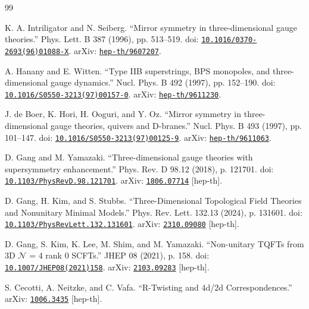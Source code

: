 \documentclass[11pt,a4paper]{article}
\numberwithin{equation}{section}
\begin{document}
\begin{thebibliography}{99}
\small

K. A. Intriligator and N. Seiberg. ``Mirror symmetry in three-dimensional gauge theories.'' Phys. Lett. B 387 (1996), pp. 513--519. doi: \href{https://doi.org/10.1016/0370-2693(96)01088-X}{\nolinkurl{10.1016/0370-2693(96)01088-X}}. arXiv: \href{https://arxiv.org/abs/hep-th/9607207}{\nolinkurl{hep-th/9607207}}.

A. Hanany and E. Witten. ``Type IIB superstrings, BPS monopoles, and three-dimensional gauge dynamics.'' Nucl. Phys. B 492 (1997), pp. 152--190. doi: \href{https://doi.org/10.1016/S0550-3213(97)00157-0}{\nolinkurl{10.1016/S0550-3213(97)00157-0}}. arXiv: \href{https://arxiv.org/abs/hep-th/9611230}{\nolinkurl{hep-th/9611230}}.

J. de Boer, K. Hori, H. Ooguri, and Y. Oz. ``Mirror symmetry in three-dimensional gauge theories, quivers and D-branes.'' Nucl. Phys. B 493 (1997), pp. 101--147. doi: \href{https://doi.org/10.1016/S0550-3213(97)00125-9}{\nolinkurl{10.1016/S0550-3213(97)00125-9}}. arXiv: \href{https://arxiv.org/abs/hep-th/9611063}{\nolinkurl{hep-th/9611063}}.

D. Gang and M. Yamazaki. ``Three-dimensional gauge theories with supersymmetry enhancement.'' Phys. Rev. D 98.12 (2018), p. 121701. doi: \href{https://doi.org/10.1103/PhysRevD.98.121701}{\nolinkurl{10.1103/PhysRevD.98.121701}}. arXiv: \href{https://arxiv.org/abs/1806.07714}{\nolinkurl{1806.07714}} [hep-th].

D. Gang, H. Kim, and S. Stubbs. ``Three-Dimensional Topological Field Theories and Nonunitary Minimal Models.'' Phys. Rev. Lett. 132.13 (2024), p. 131601. doi: \href{https://doi.org/10.1103/PhysRevLett.132.131601}{\nolinkurl{10.1103/PhysRevLett.132.131601}}. arXiv: \href{https://arxiv.org/abs/2310.09080}{\nolinkurl{2310.09080}} [hep-th].

D. Gang, S. Kim, K. Lee, M. Shim, and M. Yamazaki. ``Non-unitary TQFTs from 3D $ \mathcal{N} $ = 4 rank 0 SCFTs.'' JHEP 08 (2021), p. 158. doi: \href{https://doi.org/10.1007/JHEP08(2021)158}{\nolinkurl{10.1007/JHEP08(2021)158}}. arXiv: \href{https://arxiv.org/abs/2103.09283}{\nolinkurl{2103.09283}} [hep-th].

S. Cecotti, A. Neitzke, and C. Vafa. ``R-Twisting and 4d/2d Correspondences.'' arXiv: \href{https://arxiv.org/abs/1006.3435}{\nolinkurl{1006.3435}} [hep-th].


\end{thebibliography}
\end{document}
